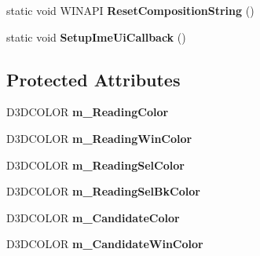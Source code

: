 \begin{DoxyCompactItemize}
\item 
\hypertarget{class_c_d_x_u_t_i_m_e_edit_box_aaf6fd90a9cd492f6194bb0a8053fbcc3}{static void W\+I\+N\+A\+P\+I {\bfseries Reset\+Composition\+String} ()}\label{class_c_d_x_u_t_i_m_e_edit_box_aaf6fd90a9cd492f6194bb0a8053fbcc3}

\item 
\hypertarget{class_c_d_x_u_t_i_m_e_edit_box_ab49ebb4117412329ac2e00943bf4d34f}{static void {\bfseries Setup\+Ime\+Ui\+Callback} ()}\label{class_c_d_x_u_t_i_m_e_edit_box_ab49ebb4117412329ac2e00943bf4d34f}

\end{DoxyCompactItemize}
\subsection*{Protected Attributes}
\begin{DoxyCompactItemize}
\item 
\hypertarget{class_c_d_x_u_t_i_m_e_edit_box_a5963bda0b88c359e6360b437abd86e7f}{D3\+D\+C\+O\+L\+O\+R {\bfseries m\+\_\+\+Reading\+Color}}\label{class_c_d_x_u_t_i_m_e_edit_box_a5963bda0b88c359e6360b437abd86e7f}

\item 
\hypertarget{class_c_d_x_u_t_i_m_e_edit_box_a9971f0c9b8a12a60884ccbe75667550d}{D3\+D\+C\+O\+L\+O\+R {\bfseries m\+\_\+\+Reading\+Win\+Color}}\label{class_c_d_x_u_t_i_m_e_edit_box_a9971f0c9b8a12a60884ccbe75667550d}

\item 
\hypertarget{class_c_d_x_u_t_i_m_e_edit_box_a9e4793780d2c6cf0819d3d0d277df0a0}{D3\+D\+C\+O\+L\+O\+R {\bfseries m\+\_\+\+Reading\+Sel\+Color}}\label{class_c_d_x_u_t_i_m_e_edit_box_a9e4793780d2c6cf0819d3d0d277df0a0}

\item 
\hypertarget{class_c_d_x_u_t_i_m_e_edit_box_ae63f71f182df873c2126c0c6d416ac90}{D3\+D\+C\+O\+L\+O\+R {\bfseries m\+\_\+\+Reading\+Sel\+Bk\+Color}}\label{class_c_d_x_u_t_i_m_e_edit_box_ae63f71f182df873c2126c0c6d416ac90}

\item 
\hypertarget{class_c_d_x_u_t_i_m_e_edit_box_a8b8a608af08e7fb7ec24200a892779d8}{D3\+D\+C\+O\+L\+O\+R {\bfseries m\+\_\+\+Candidate\+Color}}\label{class_c_d_x_u_t_i_m_e_edit_box_a8b8a608af08e7fb7ec24200a892779d8}

\item 
\hypertarget{class_c_d_x_u_t_i_m_e_edit_box_a3c5516213f115dc7d518f4de53cfbf71}{D3\+D\+C\+O\+L\+O\+R {\bfseries m\+\_\+\+Candidate\+Win\+Color}}\label{class_c_d_x_u_t_i_m_e_edit_box_a3c5516213f115dc7d518f4de53cfbf71}


\end{DoxyCompactItemize}

